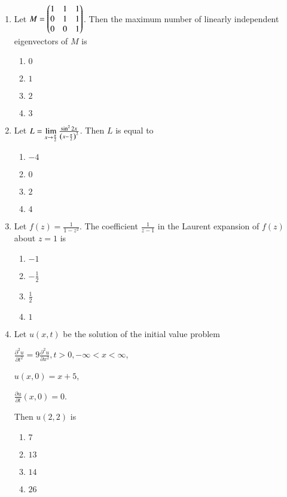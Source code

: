 \documentclass[journal,12pt,twocolumn]{IEEEtran}
\theoremstyle{remark}
\begin{document}
\begin{enumerate}
    \item Let $M=\begin{pmatrix}1&1&1 \\ 0&1&1 \\ 0&0&1\end{pmatrix}$. Then the maximum number of linearly independent eigenvectors of $M$ is
        \begin{enumerate}
            \item $0$
            \item $1$
            \item $2$
            \item $3$
        \end{enumerate}
    
    \item Let $L=\lim\limits_{x\to\frac{\pi}{2}}\frac{\sin^22x}{\left(x-\frac{\pi}{2}\right)^2}$. Then $L$ is equal to
        \begin{enumerate}
            \item $-4$
            \item $0$
            \item $2$
            \item $4$
        \end{enumerate}
    
    \item Let $f(z)=\frac{1}{1-z^2}$. The coefficient $\frac{1}{z-1}$ in the Laurent expansion of $f(z)$ about $z=1$ is
        \begin{enumerate}
            \item $-1$
            \item $-\frac{1}{2}$
            \item $\frac{1}{2}$
            \item $1$
        \end{enumerate}

    \item Let $u(x,t)$ be the solution of the initial value problem

        $\frac{\partial^2u}{\partial t^2}=9\frac{\partial^2u}{\partial x^2},t>0,-\infty<x<\infty$,

        $u(x,0)=x+5$,

        $\frac{\partial u}{\partial t}(x,0)=0$.

        Then $u(2,2)$ is
        \begin{enumerate}
            \item $7$
            \item $13$
            \item $14$
            \item $26$
        \end{enumerate}


\end{enumerate}
\end{document}
